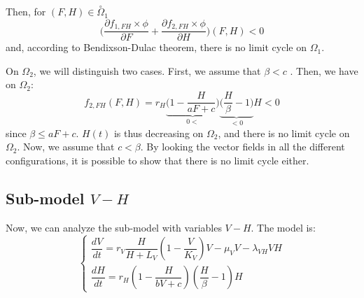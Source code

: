 \documentclass{article}
\newcommand{\lv}{\lambda_{VH}}
\begin{document}
Then, for $(F, H) \in \overset{\circ}{\Omega}_1$
\begin{equation}
\Big(\dfrac{\partial f_{1,FH} \times \phi}{\partial F} + \dfrac{\partial f_{2,FH} \times \phi}{\partial H}\Big) (F, H) < 0
\end{equation}
and, according to Bendixson-Dulac theorem, there is no limit cycle on $\Omega_1$.

On $\Omega_2$, we will distinguish two cases. First, we assume that $\beta < c$ . Then, we have on $\Omega_2$:
\begin{equation}
f_{2,FH}(F,H) = r_H \underset{0<}{\underbrace{\Big(1 - \dfrac{H}{aF + c} \Big)}}\underset{<0}{\underbrace{\Big(\dfrac{H}{\beta} -1\Big)}} H < 0
\end{equation}
since $\beta \leq aF + c$. $H(t)$ is thus decreasing on $\Omega_2$, and there is no limit cycle on $\Omega_2$.
Now, we assume that $c < \beta$. By looking the vector fields in all the different configurations, it is possible to show that there is no limit cycle either.

\subsection{Sub-model $V-H$}
Now, we can analyze the sub-model with variables $V-H$. The model is:
\begin{equation}    
\left\{ \begin{array}{l}
\dfrac{dV}{dt}=r_V \dfrac{H}{H + L_V} \left(1-\dfrac{V}{K_{V}}\right)V -\mu_V V -\lv V H\\
\dfrac{dH}{dt}=r_H \left(1-\dfrac{H}{bV + c} \right)  (\dfrac{H}{\beta} - 1) H
\end{array}\right.
\label{model:submodelVH}
\end{equation}
\end{document}
